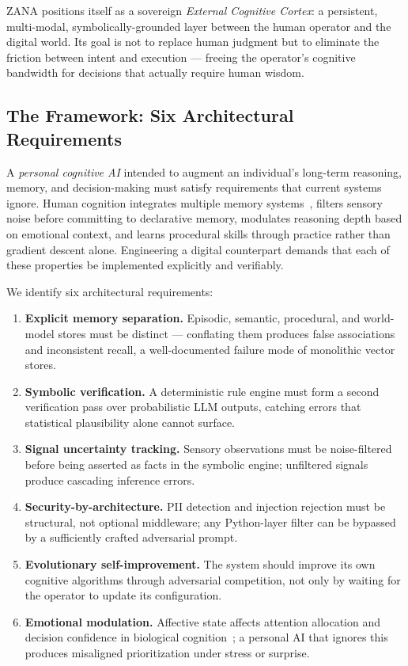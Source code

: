 \documentclass[12pt,a4paper]{article}
\begin{document}
ZANA positions itself as a sovereign \emph{External Cognitive Cortex}: a persistent,
multi-modal, symbolically-grounded layer between the human operator and the digital world.
Its goal is not to replace human judgment but to eliminate the friction between intent and
execution --- freeing the operator's cognitive bandwidth for decisions that actually require
human wisdom.

\subsection*{The Framework: Six Architectural Requirements}

A \emph{personal cognitive AI} intended to augment an individual's long-term reasoning,
memory, and decision-making must satisfy requirements that current systems ignore.
Human cognition integrates multiple memory systems~\cite{tulving1985elements}, filters
sensory noise before committing to declarative memory, modulates reasoning depth based on
emotional context, and learns procedural skills through practice rather than gradient descent
alone. Engineering a digital counterpart demands that each of these properties be implemented
explicitly and verifiably.

We identify six architectural requirements:

\begin{enumerate}[leftmargin=*, label=\textbf{R\arabic*.}]
  \item \textbf{Explicit memory separation.} Episodic, semantic, procedural, and world-model
    stores must be distinct --- conflating them produces false associations and inconsistent
    recall, a well-documented failure mode of monolithic vector stores.
  \item \textbf{Symbolic verification.} A deterministic rule engine must form a second
    verification pass over probabilistic LLM outputs, catching errors that statistical
    plausibility alone cannot surface.
  \item \textbf{Signal uncertainty tracking.} Sensory observations must be noise-filtered
    before being asserted as facts in the symbolic engine; unfiltered signals produce
    cascading inference errors.
  \item \textbf{Security-by-architecture.} PII detection and injection rejection must be
    structural, not optional middleware; any Python-layer filter can be bypassed by a
    sufficiently crafted adversarial prompt.
  \item \textbf{Evolutionary self-improvement.} The system should improve its own cognitive
    algorithms through adversarial competition, not only by waiting for the operator to
    update its configuration.
  \item \textbf{Emotional modulation.} Affective state affects attention allocation and
    decision confidence in biological cognition~\cite{bates1994emotion}; a personal AI
    that ignores this produces misaligned prioritization under stress or surprise.
\end{enumerate}
\end{document}
